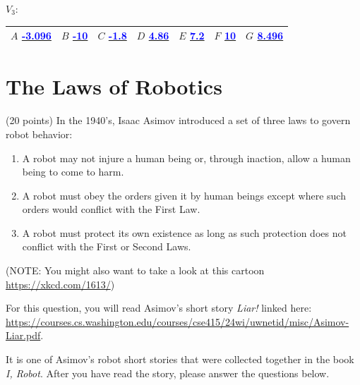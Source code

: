 \documentclass[12pt]{article}
\newenvironment{qparts}{\begin{enumerate}[{(}a{)}]}{\end{enumerate}}
\begin{document}
\begin{qparts}
  $V_3$:

  \bgroup
  \def\arraystretch{3}
  \centering
  \begin{tabular}{|p{1.5cm}|p{1.5cm}|p{1.5cm}|p{1.5cm}|p{1.5cm}|p{1.5cm}|p{1.5cm}|}
    \hline
    $A$ \underline{\textcolor{blue}{-3.096}} & $B$ \underline{\textcolor{blue}{-10}} & $C$ \underline{\textcolor{blue}{-1.8}} & $D$ \underline{\textcolor{blue}{4.86}} & $E$ \underline{\textcolor{blue}{7.2}} & $F$ \underline{\textcolor{blue}{10}} & $G$ \underline{\textcolor{blue}{8.496}} \\ \hline
  \end{tabular}
  \egroup


\end{qparts}

\newpage
\section{ The Laws of Robotics }
 (20 points) In the 1940's, Isaac Asimov introduced a set of three laws to govern robot behavior:
\begin{enumerate}
  \item A robot may not injure a human being or, through inaction, allow a human being to come to harm.
  \item A robot must obey the orders given it by human beings except where such orders would conflict with the First Law.
  \item A robot must protect its own existence as long as such protection does not conflict with the First or Second Laws.
\end{enumerate}

(NOTE: You might also want to take a look at this cartoon \url{https://xkcd.com/1613/})

For this question, you will read Asimov's short story \textit{Liar!} linked here:\\
\url{https://courses.cs.washington.edu/courses/cse415/24wi/uwnetid/misc/Asimov-Liar.pdf}.

It is one of Asimov's robot short stories that were collected together in the book \textit{I, Robot}. After you have read the story, please answer the questions below.
\end{document}
